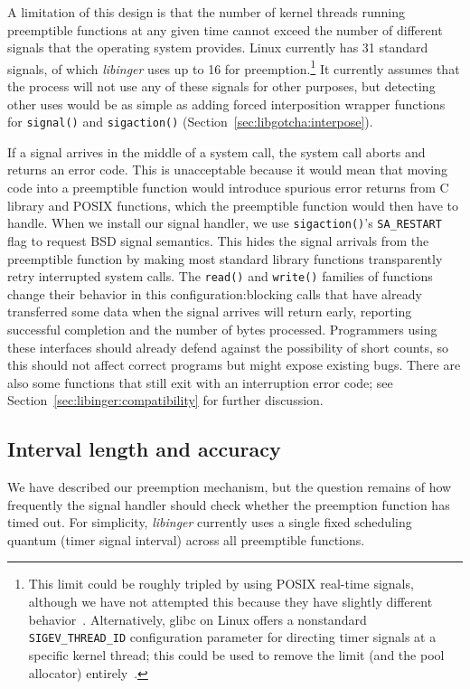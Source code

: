 A limitation of this design is that the number of kernel threads running preemptible
functions at any given time cannot exceed the number of different signals that the
operating system provides.  Linux currently has 31 standard signals, of which
\textit{libinger} uses up to 16 for preemption.\footnote{This limit could be roughly
tripled by using POSIX real-time signals, although we have not attempted this because
they have slightly different behavior~\cite{signal-manpage}.  Alternatively, glibc on
Linux offers a nonstandard \texttt{SIGEV\_THREAD\_ID} configuration parameter for
directing timer signals at a specific kernel thread; this could be used to remove the
limit (and the pool allocator) entirely~\cite{timercreate-manpage}.}  It currently
assumes that the process will not use any of these signals for other purposes, but
detecting other uses would be as simple as adding forced interposition wrapper
functions for \texttt{signal()} and \texttt{sigaction()}
(Section~\ref{sec:libgotcha:interpose}).

If a signal arrives in the middle of a system call, the system call aborts and
returns an error code.  This is unacceptable because it would mean that moving code
into a preemptible function would introduce spurious error returns from C library and
POSIX functions, which the preemptible function would then have to handle.  When we
install our signal handler, we use \texttt{sigaction()}'s \texttt{SA\_RESTART} flag
to request BSD signal semantics.  This hides the signal arrivals from the preemptible
function by making most standard library functions transparently retry interrupted
system calls.  The \texttt{read()} and \texttt{write()} families of functions change
their behavior in this configuration:\@ blocking calls that have already transferred
some data when the signal arrives will return early, reporting successful completion
and the number of bytes processed.  Programmers using these interfaces should already
defend against the possibility of short counts, so this should not affect correct
programs but might expose existing bugs.  There are also some functions that still
exit with an interruption error code; see Section~\ref{sec:libinger:compatibility}
for further discussion.


\subsection{Interval length and accuracy}

We have described our preemption mechanism, but the question remains of how
frequently the signal handler should check whether the preemption function has timed
out.  For simplicity, \textit{libinger} currently uses a single fixed scheduling
quantum (timer signal interval) across all preemptible functions.

